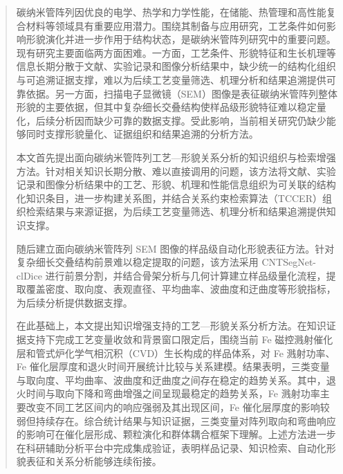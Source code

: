 
\begin{abstract}

碳纳米管阵列因优良的电学、热学和力学性能，在储能、热管理和高性能复合材料等领域具有重要应用潜力。围绕其制备与应用研究，工艺条件如何影响形貌演化并进一步作用于结构状态，是碳纳米管阵列研究中的重要问题。现有研究主要面临两方面困难。一方面，工艺条件、形貌特征和生长机理等信息长期分散于文献、实验记录和图像分析结果中，缺少统一的结构化组织与可追溯证据支撑，难以为后续工艺变量筛选、机理分析和结果追溯提供可靠依据。另一方面，扫描电子显微镜（SEM）图像是表征碳纳米管阵列整体形貌的主要依据，但其中复杂细长交叠结构使样品级形貌特征难以稳定量化，后续分析因而缺少可靠的数据支撑。受此影响，当前相关研究仍缺少能够同时支撑形貌量化、证据组织和结果追溯的分析方法。

本文首先提出面向碳纳米管阵列工艺—形貌关系分析的知识组织与检索增强方法。针对相关知识长期分散、难以直接调用的问题，该方法将文献、实验记录和图像分析结果中的工艺、形貌、机理和性能信息组织为可关联的结构化知识条目，进一步构建关系图，并结合关系约束检索算法（TCCER）组织检索结果与来源证据，为后续工艺变量筛选、机理分析和结果追溯提供知识支撑。

随后建立面向碳纳米管阵列 SEM 图像的样品级自动化形貌表征方法。针对复杂细长交叠结构前景难以稳定提取的问题，该方法采用 CNTSegNet-clDice 进行前景分割，并结合骨架分析与几何计算建立样品级量化流程，提取覆盖密度、取向度、表观直径、平均曲率、波曲度和迂曲度等形貌指标，为后续分析提供数据支撑。

在此基础上，本文提出知识增强支持的工艺—形貌关系分析方法。在知识证据支持下完成工艺变量收敛和背景窗口限定后，围绕当前 Fe 磁控溅射催化层和管式炉化学气相沉积（CVD）生长构成的样品体系，对 Fe 溅射功率、Fe 催化层厚度和退火时间开展统计比较与关系建模。结果表明，三类变量与取向度、平均曲率、波曲度和迂曲度之间存在稳定的趋势关系。其中，退火时间与取向下降和弯曲增强之间呈现最稳定的趋势关系，Fe 溅射功率主要改变不同工艺区间内的响应强弱及其出现区间，Fe 催化层厚度的影响较弱但持续存在。综合统计结果与知识证据，三类变量对阵列取向和弯曲响应的影响可在催化层形成、颗粒演化和群体耦合框架下理解。上述方法进一步在科研辅助分析平台中完成集成验证，表明样品记录、知识检索、自动化形貌表征和关系分析能够连续衔接。

\end{abstract}


